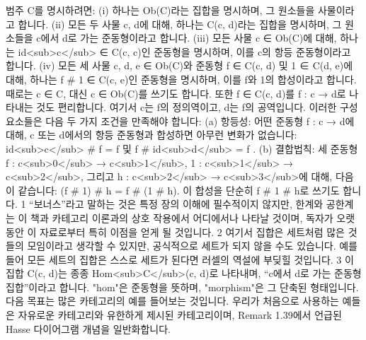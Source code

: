 \documentclass[11pt, a4paper, twoside, openany]{book}
\begin{document}
{\par\medskip
\begin{definitionbox}[정의 3.6.]
범주 C\hspace{0pt}를 명시하려면:
(i) 하나는 Ob(C)라는 집합을 명시하며, 그 원소들을 사물이라고 합니다.
(ii) 모든 두 사물 c, d\hspace{0pt}에 대해, 하나는 C(c, d)라는 집합을 명시하며, 그 원소들을 c\hspace{0pt}에서 d\hspace{0pt}로 가는 준동형이라고 합니다.
(iii) 모든 사물 c ∈ Ob(C)에 대해, 하나는 id<sub>c</sub> ∈ C(c, c)인 준동형을 명시하며, 이를 c\hspace{0pt}의 항등 준동형이라고 합니다.
(iv) 모든 세 사물 c, d, e ∈ Ob(C)와 준동형 f ∈ C(c, d) 및 1 ∈ C(d, e)에 대해, 하나는 f \# 1 ∈ C(c, e)인 준동형을 명시하며, 이를 f\hspace{0pt}와 1\hspace{0pt}의 합성이라고 합니다.
때로는 c ∈ C, 대신 c ∈ Ob(C)를 쓰기도 합니다. 또한 f ∈ C(c, d)를 f : c → d\hspace{0pt}로 나타내는 것도 편리합니다. 여기서 c\hspace{0pt}는 f\hspace{0pt}의 정의역이고, d\hspace{0pt}는 f\hspace{0pt}의 공역입니다.
이러한 구성 요소들은 다음 두 가지 조건을 만족해야 합니다:
(a) 항등성: 어떤 준동형 f : c → d\hspace{0pt}에 대해, c 또는 d\hspace{0pt}에서의 항등 준동형과 합성하면 아무런 변화가 없습니다: id<sub>c</sub> \# f = f 및 f \# id<sub>d</sub> = f .
(b) 결합법칙: 세 준동형 f : c<sub>0</sub> → c<sub>1</sub>, 1 : c<sub>1</sub> → c<sub>2</sub>, 그리고 h : c<sub>2</sub> → c<sub>3</sub>에 대해, 다음이 같습니다: (f \# 1) \# h = f \# (1 \# h). 이 합성을 단순히 f \# 1 \# h\hspace{0pt}로 쓰기도 합니다.
1 “보너스”라고 말하는 것은 특정 장의 이해에 필수적이지 않지만, 한계와 공한계는 이 책과 카테고리 이론과의 상호 작용에서 어디에서나 나타날 것이며, 독자가 오랫동안 이 자료로부터 특히 이점을 얻게 될 것입니다.
2 여기서 집합은 세트처럼 많은 것들의 모임이라고 생각할 수 있지만, 공식적으로 세트가 되지 않을 수도 있습니다. 예를 들어 모든 세트의 집합은 스스로 세트가 된다면 러셀의 역설에 부딪힐 것입니다.
3 이 집합 C(c, d)는 종종 Hom<sub>C</sub>(c, d)로 나타내며, “c\hspace{0pt}에서 d\hspace{0pt}로 가는 준동형 집합”이라고 합니다. "hom"은 준동형을 뜻하며, "morphism"은 그 단축된 형태입니다.
다음 목표는 많은 카테고리의 예를 들어보는 것입니다. 우리가 처음으로 사용하는 예들은 자유로운 카테고리와 유한하게 제시된 카테고리이며, Remark 1.39\hspace{0pt}에서 언급된 Hasse 다이어그램 개념을 일반화합니다.
\end{definitionbox}


}
\end{document}
